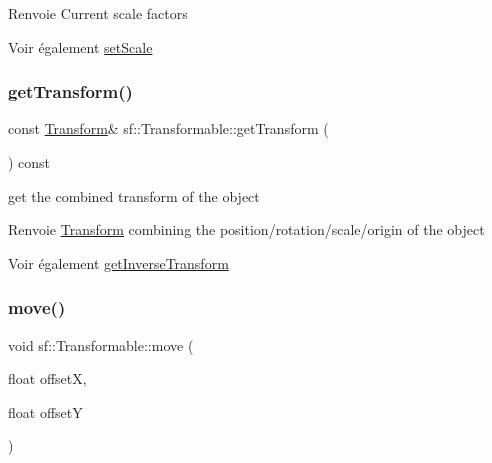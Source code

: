 \begin{DoxyReturn}{Renvoie}
Current scale factors
\end{DoxyReturn}
\begin{DoxySeeAlso}{Voir également}
\hyperlink{classsf_1_1Transformable_aaec50b46b3f41b054763304d1e727471}{set\+Scale} 
\end{DoxySeeAlso}
\mbox{\label{classsf_1_1Transformable_a7f7c3f0bab3f162b13613904fbdbb9ad}} 
\subsubsection{\texorpdfstring{get\+Transform()}{getTransform()}}
{\footnotesize\ttfamily const \hyperlink{classsf_1_1Transform}{Transform}\& sf\+::\+Transformable\+::get\+Transform (\begin{DoxyParamCaption}{ }\end{DoxyParamCaption}) const}



get the combined transform of the object 

\begin{DoxyReturn}{Renvoie}
\hyperlink{classsf_1_1Transform}{Transform} combining the position/rotation/scale/origin of the object
\end{DoxyReturn}
\begin{DoxySeeAlso}{Voir également}
\hyperlink{classsf_1_1Transformable_ab18b25f51263252ff3811465eb7e9fb1}{get\+Inverse\+Transform} 
\end{DoxySeeAlso}
\mbox{\label{classsf_1_1Transformable_a86b461d6a941ad390c2ad8b6a4a20391}} 
\subsubsection{\texorpdfstring{move()}{move()}\hspace{0.1cm}{\footnotesize\ttfamily [1/2]}}
{\footnotesize\ttfamily void sf\+::\+Transformable\+::move (\begin{DoxyParamCaption}\item[{float}]{offsetX,  }\item[{float}]{offsetY }\end{DoxyParamCaption})}



